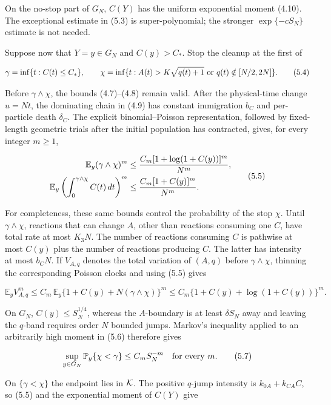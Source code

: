 On the no-stop part of \(G_N\), \(C(Y)\) has the uniform exponential
moment (4.10). The exceptional estimate in (5.3) is super-polynomial;
the stronger \(\exp\{-cS_N\}\) estimate is not needed.

Suppose now that \(Y=y\in G_N\) and \(C(y)>C_*\). Stop the cleanup at
the first of

\[
 \gamma=\inf\{t:C(t)\le C_*\},\qquad
 \chi=\inf\{t:A(t)>K\sqrt{q(t)+1}\ {\rm or}\
                       q(t)\notin[N/2,2N]\}.              \tag{5.4}
\]

Before \(\gamma\wedge\chi\), the bounds (4.7)--(4.8) remain valid. After
the physical-time change \(u=Nt\), the dominating chain in (4.9) has
constant immigration \(b_C\) and per-particle death \(\delta_C\). The
explicit binomial--Poisson representation, followed by fixed-length
geometric trials after the initial population has contracted, gives, for
every integer \(m\ge1\),

\[
\begin{split}
 \mathbb E_y(\gamma\wedge\chi)^m
 &\le {C_m[1+\log(1+C(y))]^m\over N^m},\\
 \mathbb E_y\left(\int_0^{\gamma\wedge\chi}C(t)\,dt\right)^m
 &\le {C_m[1+C(y)]^m\over N^m}.
\end{split}\tag{5.5}
\]

For completeness, these same bounds control the probability of the stop
\(\chi\). Until \(\gamma\wedge\chi\), reactions that can change \(A\),
other than reactions consuming one \(C\), have total rate at most
\(K_3N\). The number of reactions consuming \(C\) is pathwise at most
\(C(y)\) plus the number of reactions producing \(C\). The latter has
intensity at most \(b_CN\). If \(V_{A,q}\) denotes the total variation
of \((A,q)\) before \(\gamma\wedge\chi\), thinning the corresponding
Poisson clocks and using (5.5) gives

\[
 \mathbb E_y V_{A,q}^m
 \le C_m\,\mathbb E_y
       \{1+C(y)+N(\gamma\wedge\chi)\}^m
 \le C_m\{1+C(y)+\log(1+C(y))\}^m.                        \tag{5.6}
\]

On \(G_N\), \(C(y)\le S_N^{1/4}\), whereas the \(A\)-boundary is at
least \(\delta S_N\) away and leaving the \(q\)-band requires order
\(N\) bounded jumps. Markov's inequality applied to an arbitrarily high
moment in (5.6) therefore gives

\[
 \sup_{y\in G_N}\mathbb P_y\{\chi<\gamma\}
 \le C_mS_N^{-m}\quad\hbox{for every }m.                  \tag{5.7}
\]

On \(\{\gamma<\chi\}\) the endpoint lies in \({\cal K}\). The positive
\(q\)-jump intensity is \(k_{0A}+k_{CA}C\), so (5.5) and the exponential
moment of \(C(Y)\) give

